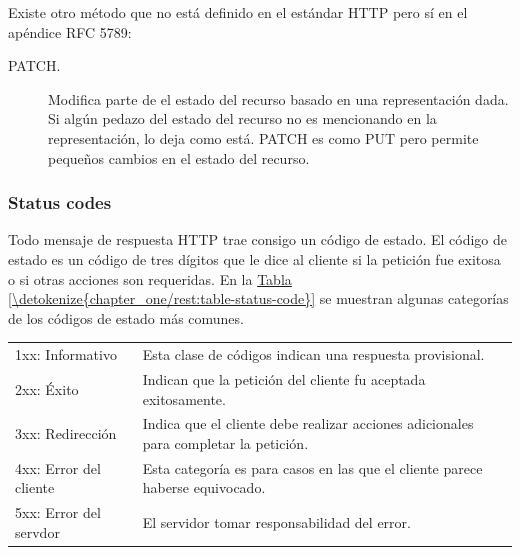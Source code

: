 Existe otro método que no está definido en el estándar HTTP pero sí en
el apéndice RFC 5789:
\begin{description}
\item[{PATCH.}] \leavevmode
Modifica parte de el estado del recurso basado en una representación
dada. Si algún pedazo del estado del recurso no es mencionando en la
representación, lo deja como está. PATCH es como PUT pero permite
pequeños cambios en el estado del recurso.

\end{description}


\subsubsection{Status codes}
\label{\detokenize{chapter_one/rest:status-codes}}
Todo mensaje de respuesta HTTP trae consigo un código de estado. El
código de estado es un código de tres dígitos que le dice al cliente si
la petición fue exitosa o si otras acciones son requeridas. En la
\hyperref[\detokenize{chapter_one/rest:table-status-code}]{Tabla \ref{\detokenize{chapter_one/rest:table-status-code}}} se muestran algunas categorías
de los códigos de estado más comunes.


\begin{savenotes}\sphinxattablestart
\centering
{}
\label{\detokenize{chapter_one/rest:table-status-code}}
\sphinxaftercaption
\begin{tabulary}{\linewidth}[t]{|T|T|}
\hline
{}\relax &\relax \\
\hline
1xx: Informativo
&
Esta clase de códigos indican una respuesta provisional.
\\
\hline
2xx: Éxito
&
Indican que la petición del cliente fu aceptada exitosamente.
\\
\hline
3xx: Redirección
&
Indica que el cliente debe realizar acciones adicionales para completar la petición.
\\
\hline
4xx: Error del cliente
&
Esta categoría es para casos en las que el cliente parece haberse equivocado.
\\
\hline
5xx: Error del servdor
&
El servidor tomar responsabilidad del error.
\\
\hline
\end{tabulary}
\par
\sphinxattableend\end{savenotes}


